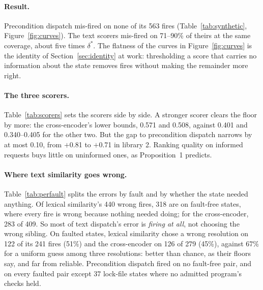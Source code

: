 \documentclass[11pt]{article}
\begin{document}
\paragraph{Result.}
Precondition dispatch mis-fired on none of its 563 fires (Table~\ref{tab:synthetic},
Figure~\ref{fig:curves}). The text scorers mis-fired on 71--90\% of theirs at the same coverage,
about five times $\delta^\ast$. The flatness of the curves in Figure~\ref{fig:curves} is the
identity of Section~\ref{sec:identity} at work: thresholding a score that carries no information
about the state removes fires without making the remainder more right.

\begin{table}[t]
\centering
\caption{Each text scorer's baseline floor (strict top-1 on the tune block, with its Wilson lower
bound against chance 1/3), its wrong fires at the matched point, and its difference from
precondition dispatch.}
\label{tab:scorers}
\small
\setlength{\tabcolsep}{3pt}
\resizebox{\linewidth}{!}{}
\end{table}

\paragraph{The three scorers.}
Table~\ref{tab:scorers} sets the scorers side by side. A stronger scorer clears the floor by more:
the cross-encoder's lower bounds, 0.571 and 0.508, against 0.401 and 0.340--0.405 for the other
two. But the gap to precondition dispatch narrows by at most 0.10, from $+$0.81 to $+$0.71 in
library 2. Ranking quality on informed requests buys little on uninformed ones, as
Proposition~1 predicts.

\begin{table}[t]
\centering
\caption{Fires and wrong fires by fault, summed over the three libraries, each text scorer at its
own matched threshold. Each intent has 40 faulted and 40 fault-free pairs per library.}
\label{tab:perfault}
\small

\end{table}

\paragraph{Where text similarity goes wrong.}
Table~\ref{tab:perfault} splits the errors by fault and by whether the state needed anything.
Of lexical similarity's 440 wrong fires, 318 are on fault-free states, where every fire is wrong
because nothing needed doing; for the cross-encoder, 283 of 409. So most of text dispatch's
error is \emph{firing at all}, not choosing the wrong sibling. On faulted states, lexical
similarity chose a wrong resolution on 122 of its 241 fires (51\%) and the cross-encoder on 126
of 279 (45\%), against 67\% for a uniform guess among three resolutions: better than chance, as
their floors say, and far from reliable. Precondition dispatch fired on no fault-free pair, and on
every faulted pair except 37 lock-file states where no admitted program's checks held.
\end{document}

